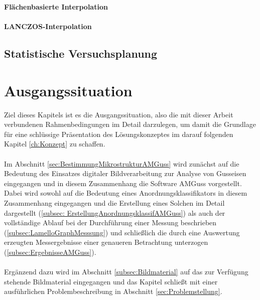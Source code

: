 \documentclass[
fontsize=10pt, 
listof = totoc,
parskip = half	
]{report}
\begin{document}
%		
%

\noindent\textbf{Flächenbasierte Interpolation}
\\\\
\noindent\textbf{LANCZOS-Interpolation}


\section{Statistische Versuchsplanung}
\label{sec:MethodenStatAnalyse}


\chapter{Ausgangssituation}
\label{ch:Ausgangssituation}
Ziel dieses Kapitels ist es die Ausgangssituation, also die mit dieser Arbeit verbundenen Rahmenbedingungen im Detail darzulegen, um damit die Grundlage für eine schlüssige Präsentation des Lösungskonzeptes im darauf folgenden Kapitel \ref{ch:Konzept} zu schaffen.
\\\\
Im Abschnitt \ref{sec:BestimmungMikrostrukturAMGuss} wird zunächst auf die Bedeutung des Einsatzes digitaler Bildverarbeitung zur Analyse von Gusseisen eingegangen und in diesem Zusammenhang die Software AMGuss vorgestellt. Dabei wird sowohl auf die Bedeutung eines Anordnungsklassifikators in diesem Zusammenhang eingegangen und die Erstellung eines Solchen im Detail dargestellt (\ref{subsec: ErstellungAnordnungsklassifAMGuss}) als auch der vollständige Ablauf bei der Durchführung einer Messung beschrieben (\ref{subsec:LamelloGraphMesssung}) und schließlich die durch eine Auswertung erzeugten Messergebnisse einer genaueren Betrachtung unterzogen (\ref{subsec:ErgebnisseAMGuss}).
\\\\
Ergänzend dazu wird im Abschnitt \ref{subsec:Bildmaterial} auf das zur Verfügung stehende Bildmaterial eingegangen und das Kapitel schließt mit einer ausführlichen Problembeschreibung in Abschnitt \ref{sec:Problemstellung}.
\end{document}

